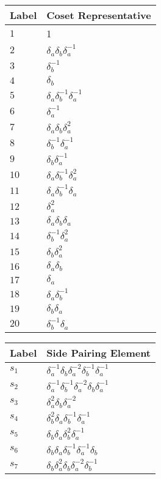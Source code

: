 \documentclass{article}
\begin{document}
\begin{center}
\begin{tabular}{ll}
\toprule
Label & Coset Representative\\
\midrule
$1$ & 1 \\
$2$ & $\delta_a^{}\delta_b^{}\delta_a^{-1}$ \\
$3$ & $\delta_b^{-1}$ \\
$4$ & $\delta_b^{}$ \\
$5$ & $\delta_a^{}\delta_b^{-1}\delta_a^{-1}$ \\
$6$ & $\delta_a^{-1}$ \\
$7$ & $\delta_a^{}\delta_b^{}\delta_a^{2}$ \\
$8$ & $\delta_b^{-1}\delta_a^{-1}$ \\
$9$ & $\delta_b^{}\delta_a^{-1}$ \\
$10$ & $\delta_a^{}\delta_b^{-1}\delta_a^{2}$ \\
$11$ & $\delta_a^{}\delta_b^{-1}\delta_a^{}$ \\
$12$ & $\delta_a^{2}$ \\
$13$ & $\delta_a^{}\delta_b^{}\delta_a^{}$ \\
$14$ & $\delta_b^{-1}\delta_a^{2}$ \\
$15$ & $\delta_b^{}\delta_a^{2}$ \\
$16$ & $\delta_a^{}\delta_b^{}$ \\
$17$ & $\delta_a^{}$ \\
$18$ & $\delta_a^{}\delta_b^{-1}$ \\
$19$ & $\delta_b^{}\delta_a^{}$ \\
$20$ & $\delta_b^{-1}\delta_a^{}$ \\
\bottomrule
\end{tabular}
\hfill
\begin{tabular}{ll}
\toprule
Label & Side Pairing Element\\
\midrule
$s_{1}$ & $\delta_a^{-1}\delta_b^{}\delta_a^{-2}\delta_b^{-1}\delta_a^{-1}$ \\
$s_{2}$ & $\delta_a^{-1}\delta_b^{-1}\delta_a^{-2}\delta_b^{}\delta_a^{-1}$ \\
$s_{3}$ & $\delta_a^{2}\delta_b^{}\delta_a^{-2}$ \\
$s_{4}$ & $\delta_b^{2}\delta_a^{}\delta_b^{-1}\delta_a^{-1}$ \\
$s_{5}$ & $\delta_b^{}\delta_a^{}\delta_b^{2}\delta_a^{-1}$ \\
$s_{6}$ & $\delta_b^{}\delta_a^{}\delta_b^{-1}\delta_a^{-1}\delta_b^{}$ \\
$s_{7}$ & $\delta_b^{}\delta_a^{2}\delta_b^{}\delta_a^{-2}\delta_b^{-1}$ \\

\end{tabular}
\end{center}
\end{document}

